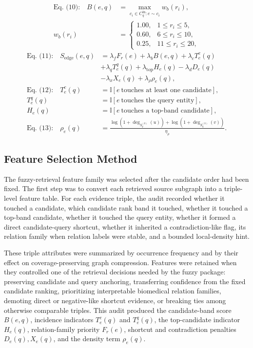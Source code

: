 \documentclass[11pt]{article}
\begin{document}
    \[
    \begin{aligned}
    \text{Eq. (10):}\quad
    B(e,q)&=\max_{c_i\in C^{\mathrm{in}}_q: e\sim c_i}w_b(r_i),\\
    w_b(r_i)&=
    \begin{cases}
    1.00, & 1\le r_i\le5,\\
    0.60, & 6\le r_i\le10,\\
    0.25, & 11\le r_i\le20,
    \end{cases}
    \end{aligned}
    \]
    \[
    \begin{aligned}
    \text{Eq. (11):}\quad
    S_{\mathrm{edge}}(e,q)&=
    \lambda_fF_r(e)+\lambda_bB(e,q)+\lambda_cT^c_e(q)\\
    &+\lambda_qT^q_e(q)+\lambda_{\mathrm{top}}H_e(q)-\lambda_dD_e(q)\\
    &-\lambda_xX_e(q)+\lambda_\rho\rho_e(q),\\
    \text{Eq. (12):}\quad
    T^c_e(q)&=\mathbb{I}[e\ \text{touches at least one candidate}],\\
    T^q_e(q)&=\mathbb{I}[e\ \text{touches the query entity}],\\
    H_e(q)&=\mathbb{I}[e\ \text{touches a top-band candidate}],\\
    \text{Eq. (13):}\quad
    \rho_e(q)&=\frac{\log(1+\deg_{S^{(0)}_q}(u))+\log(1+\deg_{S^{(0)}_q}(v))}{\eta_\rho}.
    \end{aligned}
    \]

    \subsection{Feature Selection Method}

    The fuzzy-retrieval feature family was selected after the candidate order had been fixed. The first step was to convert each retrieved source subgraph into a triple-level feature table. For each evidence triple, the audit recorded whether it touched a candidate, which candidate rank band it touched, whether it touched a top-band candidate, whether it touched the query entity, whether it formed a direct candidate-query shortcut, whether it inherited a contradiction-like flag, its relation family when relation labels were stable, and a bounded local-density hint.

    These triple attributes were summarized by occurrence frequency and by their effect on coverage-preserving graph compression. Features were retained when they controlled one of the retrieval decisions needed by the fuzzy package: preserving candidate and query anchoring, transferring confidence from the fixed candidate ranking, prioritizing interpretable biomedical relation families, demoting direct or negative-like shortcut evidence, or breaking ties among otherwise comparable triples. This audit produced the candidate-band score \(B(e,q)\), incidence indicators \(T^c_e(q)\) and \(T^q_e(q)\), the top-candidate indicator \(H_e(q)\), relation-family priority \(F_r(e)\), shortcut and contradiction penalties \(D_e(q),X_e(q)\), and the density term \(\rho_e(q)\).
\end{document}
